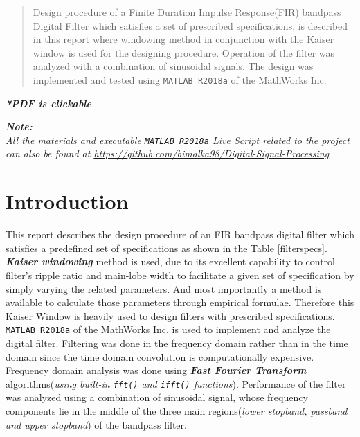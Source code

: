 \documentclass[a4paper,11pt]{article}%
\begin{document}


\begin{abstract}
	Design procedure of a Finite Duration Impulse Response(FIR) bandpass Digital Filter which satisfies a set of prescribed specifications, is described in this report where windowing method in conjunction with the Kaiser window is used for the designing procedure. Operation of the filter was analyzed with a combination of sinusoidal signals. The design was implemented and tested using {\tt MATLAB R2018a} of the MathWorks Inc.
\end{abstract}

\pagebreak

\tableofcontents
\listoffigures
\listoftables
\vfill
\begin{center}
	\textbf{\textit{*PDF is clickable}}
\end{center}

\textit{\textbf{Note:}}\\
\textit{All the materials and executable {\tt MATLAB R2018a} Live Script related to the project can also be found at \url{https://github.com/bimalka98/Digital-Signal-Processing}}
\pagebreak

\section{Introduction}

This report describes the design procedure of an FIR bandpass digital filter which satisfies a predefined set of specifications as shown in the Table \ref{filterspecs}.\textbf{\textit{ Kaiser windowing}} method is used, due to its excellent capability to control filter's ripple ratio  and main-lobe width to facilitate a given set of specification by simply varying the related parameters. And most importantly a method is available to calculate those parameters through empirical formulae. Therefore this Kaiser Window is heavily used to design filters with prescribed specifications.\\

{\tt MATLAB R2018a} of the MathWorks Inc. is used to implement and analyze the digital filter. Filtering was done in the frequency domain rather than in the time domain since the time domain convolution is computationally expensive. Frequency domain analysis was done using \textbf{\textit{Fast Fourier Transform}} algorithms(\textit{using built-in {\tt fft()} and {\tt ifft()} functions}). Performance of the filter was analyzed using a combination of sinusoidal signal, whose frequency components lie in the middle of the three main regions(\textit{lower stopband, passband and upper stopband}) of the bandpass filter. 
\end{document}
